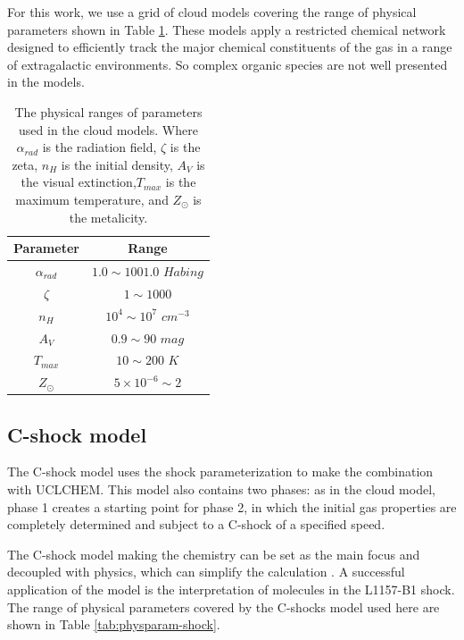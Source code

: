 \documentclass{aa}
\begin{document}
\begin{CJK*}{UTF8}{gbsn}
   For this work, we use a grid of cloud models covering the range of physical parameters shown in Table \ref{tab:physparam}. These models apply a restricted chemical network designed to efficiently track the major chemical constituents of the gas in a range of extragalactic environments. So complex organic species are not well presented in the models. 
   
    \begin{table}[]
    \centering
    \begin{tabular}{cc}
    \hline\hline
    Parameter           & Range               \\
    \hline
    $\alpha _{rad}$                 & $1.0 \sim 1001.0$ $ Habing$ \\
    $\zeta$                         & $1\sim1000 $          \\
    $n_{H}$                         & $10^4\sim10^7$ $cm^{-3}$  \\
    $A_V$                           & $0.9 \sim 90$ $mag$   \\
    $T_{max}$                       & $10 \sim 200 $  $K$   \\
    $Z_{\odot}$                     & $5\times10^{-6} \sim 2  $       \\
    \hline
    \end{tabular}
    \caption{The physical ranges of parameters used in the cloud models. Where $\alpha _{rad}$ is the radiation field, $\zeta$ is the zeta, $n_{H}$ is the initial density, $A_V$ is the visual extinction,$T_{max}$ is the maximum temperature, and $Z_{\odot}$ is the metalicity.}
    \label{tab:physparam}
    \end{table}
   
   
\subsection{C-shock model}

   The C-shock model uses the shock  parameterization \citep{jimenez2008parametrization} to make the combination with UCLCHEM. This model also contains two phases: as in the cloud model, phase 1 creates a starting point for phase 2, in which the initial gas properties are completely determined and subject to a C-shock of a specified speed. 
   
   The C-shock model making the chemistry can be set as the main focus and decoupled with physics, which can simplify the calculation \citep{flower2015interpreting}. A successful application of the model is the interpretation of molecules in the L1157-B1 \citep{viti2011l1157,gomez2015density,holdship2016h2s} shock. The range of physical parameters covered by the C-shocks model used \citep{jimenez2008parametrization} here are shown in Table \ref{tab:physparam-shock}.
   

\end{CJK*}
\end{document}
